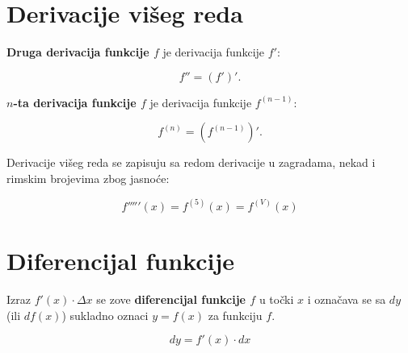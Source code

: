 \section{Derivacije višeg reda}

\begin{definitionbox}
    \textbf{Druga derivacija funkcije $f$} je derivacija funkcije $f'$:

    \begin{equation*}
        f'' = (f')'.
    \end{equation*}

    \textbf{$n$-ta derivacija funkcije $f$} je derivacija funkcije $f^{(n-1)}$:

    \begin{equation*}
        f^{(n)} = \left(f^{(n-1)}\right)'.
    \end{equation*}
\end{definitionbox}

Derivacije višeg reda se zapisuju sa redom derivacije u zagradama, nekad i rimskim
brojevima zbog jasnoće:

$$
f'''''(x) = f^{(5)}(x) = f^{(V)}(x)
$$

\section{Diferencijal funkcije}

\begin{definitionbox}
    Izraz $f'(x)\cdot\Delta x$ se zove \textbf{diferencijal funkcije $f$} u točki
    $x$ i označava se sa $dy$ (ili $df(x)$) sukladno oznaci $y=f(x)$ za funkciju $f$.

    \begin{equation*}
        dy = f'(x)\cdot dx
    \end{equation*}
\end{definitionbox}

